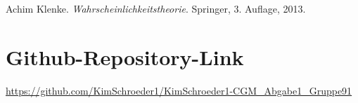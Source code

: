 \documentclass[a4paper,12pt]{article}
\begin{document}
\newpage
\renewcommand{\refname}{Literatur}
\begin{thebibliography}{9}
     \hypertarget{source1}{} Achim Klenke. \textit{Wahrscheinlichkeitstheorie}. Springer, 3. Auflage, 2013.
   
\end{thebibliography}
\section{Github-Repository-Link} \url{https://github.com/KimSchroeder1/KimSchroeder1-CGM_Abgabe1_Gruppe91}
\end{document}
